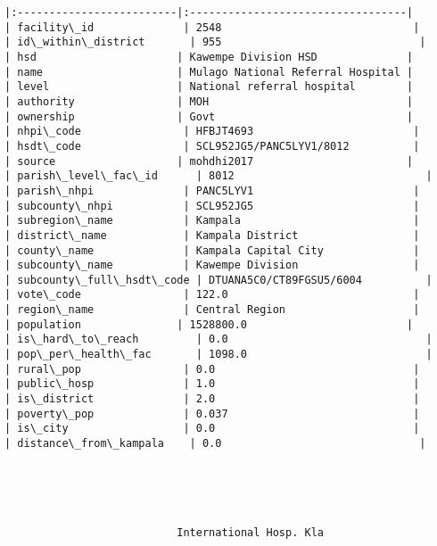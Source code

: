 \documentclass[11pt]{article}
\begin{document}
\begin{Verbatim}[commandchars=\\\{\}]
|:-------------------------|:----------------------------------|
| facility\_id              | 2548                              |
| id\_within\_district       | 955                               |
| hsd                      | Kawempe Division HSD              |
| name                     | Mulago National Referral Hospital |
| level                    | National referral hospital        |
| authority                | MOH                               |
| ownership                | Govt                              |
| nhpi\_code                | HFBJT4693                         |
| hsdt\_code                | SCL952JG5/PANC5LYV1/8012          |
| source                   | mohdhi2017                        |
| parish\_level\_fac\_id      | 8012                              |
| parish\_nhpi              | PANC5LYV1                         |
| subcounty\_nhpi           | SCL952JG5                         |
| subregion\_name           | Kampala                           |
| district\_name            | Kampala District                  |
| county\_name              | Kampala Capital City              |
| subcounty\_name           | Kawempe Division                  |
| subcounty\_full\_hsdt\_code | DTUANA5C0/CT89FGSU5/6004          |
| vote\_code                | 122.0                             |
| region\_name              | Central Region                    |
| population               | 1528800.0                         |
| is\_hard\_to\_reach         | 0.0                               |
| pop\_per\_health\_fac       | 1098.0                            |
| rural\_pop                | 0.0                               |
| public\_hosp              | 1.0                               |
| is\_district              | 2.0                               |
| poverty\_pop              | 0.037                             |
| is\_city                  | 0.0                               |
| distance\_from\_kampala    | 0.0                               |





                           International Hosp. Kla                            


\end{Verbatim}
\end{document}
